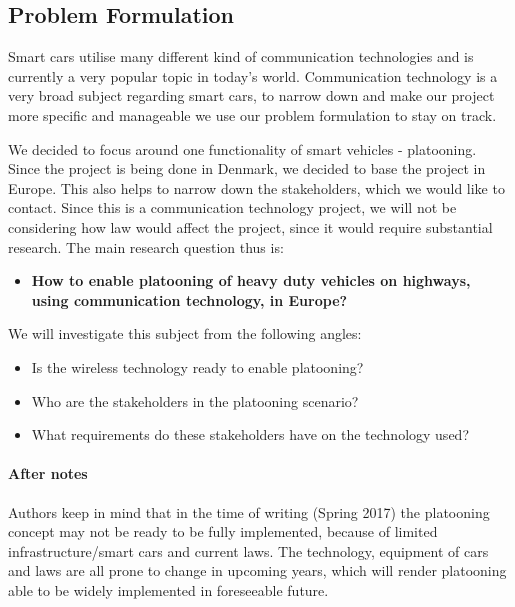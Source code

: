 \subsection{Problem Formulation}

Smart cars utilise many different kind of communication technologies and is currently a very popular topic in today's world. Communication technology is a very broad subject regarding smart cars, to narrow down and make our project more specific and manageable we use our problem formulation to stay on track.\par
We decided to focus around one functionality of smart vehicles - platooning. Since the project is being done in Denmark, we decided to base the project in Europe. This also helps to narrow down the stakeholders, which we would like to contact.
Since this is a communication technology project, we will not be considering how law would affect the project, since it would require substantial research. The main research question thus is:
% 
\begin{itemize}
    \item \textbf{How to enable platooning of heavy duty vehicles on highways, using communication technology, in Europe?}
\end{itemize}
% 
We will investigate this subject from the following angles:
\begin{itemize}[nolistsep,noitemsep]
    \item Is the wireless technology ready to enable platooning?
    \item Who are the stakeholders in the platooning scenario?
    \item What requirements do these stakeholders have on the technology used?
\end{itemize}
% 
\paragraph{After notes}\par
Authors keep in mind that in the time of writing (Spring 2017) the platooning concept may not be ready to be fully implemented, because of limited infrastructure/smart cars and current laws. The technology, equipment of cars and laws are all prone to change in upcoming years, which will render platooning able to be widely implemented in foreseeable future.